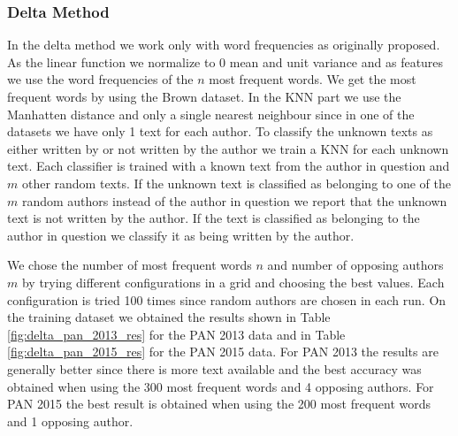 \subsubsection{Delta Method} \label{subsubsec:method:delta_method}
In the delta method we work only with word frequencies as originally proposed.
As the linear function we normalize to 0 mean and unit variance and as features
we use the word frequencies of the $n$ most frequent words. We get the most
frequent words by using the Brown dataset. In the \gls{KNN} part we use the
Manhatten distance and only a single nearest neighbour since in one of the
datasets we have only 1 text for each author. To classify the unknown texts as
either written by or not written by the author we train a \gls{KNN} for each
unknown text. Each classifier is trained with a known text from the author
in question and $m$ other random texts. If the unknown text is classified as
belonging to one of the $m$ random authors instead of the author in question
we report that the unknown text is not written by the author. If the text is
classified as belonging to the author in question we classify it as being
written by the author.

We chose the number of most frequent words $n$ and number of opposing
authors $m$ by trying different configurations in a grid and choosing the
best values. Each configuration is tried 100 times since random authors are
chosen in each run. On the training dataset we obtained the results shown in
Table \ref{fig:delta_pan_2013_res} for the PAN 2013 data and in Table
\ref{fig:delta_pan_2015_res} for the PAN 2015 data. For PAN 2013 the results are
generally better since there is more text available and the best accuracy was
obtained when using the 300 most frequent words and 4 opposing authors. For PAN
2015 the best result is obtained when using the 200 most frequent words and 1
opposing author.

